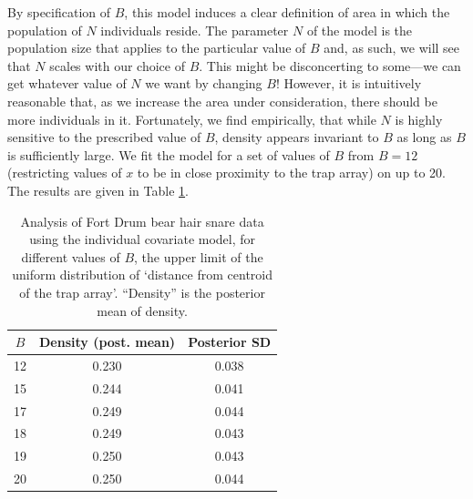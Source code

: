 By specification of $B$, this model induces a clear definition of area
in which the population of $N$ individuals reside.  The parameter $N$
of the model is the population size that applies to the particular
value of $B$ and, as such, we will see that $N$ scales with our choice
of $B$.  This might be disconcerting to some---we can get whatever
value of $N$ we want by changing $B$! However, it is intuitively
reasonable that, as we increase the area under consideration, there
should be more individuals in it.  Fortunately, we find empirically,
that while $N$ is highly sensitive to the prescribed value of $B$,
density appears invariant to $B$ as long as $B$ is sufficiently
large. We fit the model for a set of values of $B$ from $B=12$
(restricting values of $x$ to be in close proximity to the trap array)
on up to 20. The results are given in Table \ref{closed.tab.Dmax}.

\begin{table}[ht]
\centering
\caption{Analysis of Fort Drum bear hair snare data using the
  individual covariate model, for different values of $B$, the upper
  limit of the uniform distribution of `distance from centroid of the
  trap array'. ``Density'' is the posterior mean of density.}
\begin{tabular}{ccc}
\hline \hline
 $B$ & Density (post. mean) & Posterior SD \\ \hline
  12& 0.230 & 0.038 \\
  15& 0.244 &0.041 \\
  17& 0.249 &0.044 \\
  18& 0.249 &0.043\\
  19& 0.250 &0.043\\
  20& 0.250 &0.044 \\
\hline
\end{tabular}
\label{closed.tab.Dmax}
\end{table}


